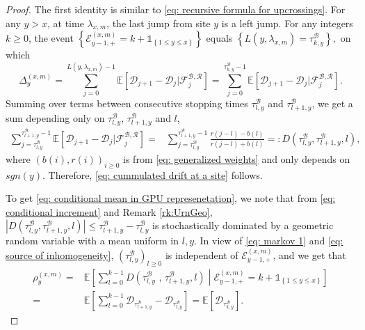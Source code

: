 \documentclass[EJP]{ejpecp} %
\newcommand{\abs}[1]{\left\vert #1 \right\vert}
\begin{document}
\begin{proof} 
	The first identity is similar to \eqref{eq: recursive formula for upcrossings}.
	For any $y>x $, at time $\lambda_{x,m}$, the last jump from site $y$ is a left jump. For any integers $k\geq 0$, the event 
	$\left\{ \mathcal{E}^{(x,m)}_{y-1,+} =k +  \mathbb{1}_{\left\{1\leq y\leq x\right\}}\right\}$ equals $\left\{  L(y,\lambda_{x,m}) = \tau_{k,y}^{\mathscr{B}} \right\}, $ on which
	\[
	\Delta_{y}^{(x,m)} =\sum_{j=0}^{ L(y,\lambda_{x,m})-1} \mathbb{E}\left[ \mathscr{D}_{j+1} -\mathscr{D}_{j}  \vert \mathcal{F}^{\mathscr{B},\mathscr{R}}_{j} \right] = \sum_{j=0}^{\tau^\mathscr{B}_{k,y}-1} \mathbb{E}\left[ \mathscr{D}_{j+1} -\mathscr{D}_{j}  \vert \mathcal{F}^{\mathscr{B},\mathscr{R}}_{j} \right].  
	\] 
	Summing over terms between consecutive stopping times $\tau^{{\mathscr{B}}}_{l,y} $ and $\tau^{\mathscr{B}}_{l+1,y} $,  we get a sum depending only on $\tau^{\mathscr{B}}_{l,y} $, $\tau^{\mathscr{B}}_{l+1,y} $ and $l$, 
	\begin{align} \label{eq: conditional increment}
		\sum_{j=\tau^{\mathscr{B}}_{l,y}}^{\tau^{\mathscr{B}}_{l+1,y}-1} \mathbb{E}\left[ \mathscr{D}_{j+1} - \mathscr{D}_{j}  \vert \mathcal{F}^{\mathscr{B},\mathscr{R}}_{j} \right] =&
		\sum_{j=\tau^{\mathscr{B}}_{l,y}}^{\tau^{\mathscr{B}}_{l+1,y}-1} \frac{ r( j-l) - b(l)  }{ r( j-l) + b(l)  } 
		=:  D\left(\tau^{\mathscr{B}}_{l,y},\tau^{\mathscr{B}}_{l+1,y},l\right),
	\end{align}   
	where $(b(i),r(i))_{i\geq 0}$ is from \eqref{eq: generalized weights} and only depends on $sgn(y)$. Therefore, \eqref{eq: cummulated drift at a site} follows.
	
	To get \eqref{eq: conditional mean in GPU represenetation}, we note that from \eqref{eq: conditional increment} and Remark \ref{rk:UrnGeo}, $\abs{  D\left(\tau^{\mathscr{B}}_{l,y},\tau^{\mathscr{B}}_{l+1,y},l\right)} \leq  \tau^{\mathscr{B}}_{l+1,y}-\tau^{\mathscr{B}}_{l,y}$ is stochastically dominated by a geometric random variable with a mean uniform in $l, y$. In view of \eqref{eq: markov 1} and \eqref{eq: source of inhomogeneity},  $\left(\tau^{\mathscr{B}}_{l,y}\right)_{l \geq 0} $ is independent of $ \mathcal{E}^{(x,m)}_{y-1,+}$, and we get that 
	\begin{align*} 
		\rho_{y}^{(x,m)} 
		=& \mathbb{E}\left[ \sum_{l=0 }^{ k -1  }  D\left(\tau^{\mathscr{B}}_{l,y}\,\,,\,\tau^{\mathscr{B}}_{l+1,y} , l \right) \middle| \mathcal{E}^{(x,m)}_{y-1,+} = k + \mathbb{1}_{\left\{1\leq y\leq x\right\}} \right]	
		\\
		=&
		 \mathbb{E}\left[ \sum_{l=0}^{k-1}  \mathscr{D}_{\tau^{\mathscr{B}}_{l+1,y}} -\mathscr{D}_{\tau^{\mathscr{B}}_{l,y}} \right]  
		= \mathbb{E}\left[  \mathscr{D}_{\tau^{\mathscr{B}}_{k,y}} \right]
		.
	\end{align*}
\end{proof}
\end{document}

